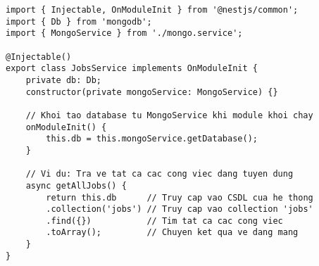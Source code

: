 \begin{lstlisting}
import { Injectable, OnModuleInit } from '@nestjs/common';
import { Db } from 'mongodb';
import { MongoService } from './mongo.service';

@Injectable()
export class JobsService implements OnModuleInit {
    private db: Db;
    constructor(private mongoService: MongoService) {}
    
    // Khoi tao database tu MongoService khi module khoi chay
    onModuleInit() {
        this.db = this.mongoService.getDatabase();
    }
    
    // Vi du: Tra ve tat ca cac cong viec dang tuyen dung
    async getAllJobs() {
        return this.db      // Truy cap vao CSDL cua he thong
        .collection('jobs') // Truy cap vao collection 'jobs'
        .find({})           // Tim tat ca cac cong viec
        .toArray();         // Chuyen ket qua ve dang mang
    }
}
\end{lstlisting}